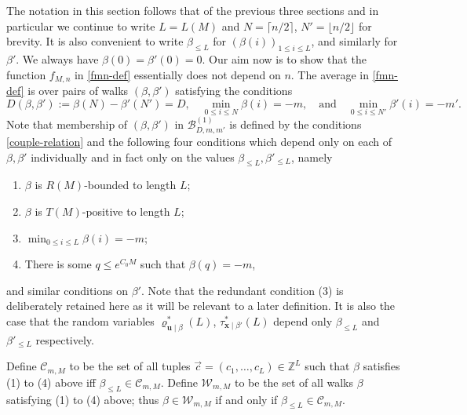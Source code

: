 \documentclass[11pt,reqno]{amsart}
\numberwithin{equation}{section}
\theoremstyle{definition}
\theoremstyle{remark}
\newcommand{\mbf}{\mathbf}
\renewcommand{\le}{\leqslant}
\newcommand\Z{\mathbb{Z}}
\begin{document}
The notation in this section follows that of the previous three sections and in particular we continue to write $L = L(M)$ and $N = \lceil n/2\rceil$, $N' = \lfloor n/2\rfloor$ for brevity. It is also convenient to write $\beta_{\le L}$ for $(\beta(i))_{1 \le i \le L}$, and similarly for $\beta'$. We always have $\beta(0) = \beta'(0) = 0$. Our aim now is to show that the function $f_{M,n}$ in \cref{fmn-def} essentially does not depend on $n$. The average in \cref{fmn-def} is over pairs of walks $(\beta,\beta')$ satisfying the conditions \begin{equation}\label{couple-relation} D(\beta,\beta') := \beta(N) - \beta'(N') = D, \quad \min_{0 \le i \le N} \beta(i) = -m, \quad \mbox{and} \quad \min_{0 \le i \le N'} \beta'(i) = -m'.\end{equation}
Note that membership of $(\beta, \beta')$ in $\mathscr{B}^{(1)}_{D,m,m'}$ is defined by the conditions \cref{couple-relation} and the  following four conditions which depend only on each of $\beta,\beta'$ individually and in fact only on the values $\beta_{\le L}, \beta'_{\le L}$, namely 
\begin{enumerate}
    \item $\beta$ is $R(M)$-bounded to length $L$;
    \item $\beta$ is $T(M)$-positive to length $L$;
    \item $\min_{0 \le i \le L} \beta(i) = -m$;
    \item There is some $q \le e^{C_0 M}$ such that $\beta(q) = -m$,
\end{enumerate}
and similar conditions on $\beta'$. Note that the redundant condition (3) is deliberately retained here as it will be relevant to a later definition. It is also the case that the random variables $ \varrho^*_{\mbf{u} \mid \beta}(L)$, $\tau^*_{\mbf{x} \mid \beta'}(L)$ depend only $\beta_{\le L}$ and $\beta'_{\le L}$ respectively.

Define $\mathscr{C}_{m,M}$ to be the set of all tuples $\vec{c} = (c_1,\dots, c_L) \in \Z^L$ such that $\beta$ satisfies (1) to (4) above iff $\beta_{\le L} \in \mathscr{C}_{m,M}$. Define $\mathscr{W}_{m,M}$ to be the set of all walks $\beta$ satisfying (1) to (4) above; thus $\beta \in \mathscr{W}_{m,M}$ if and only if $\beta_{\le L} \in \mathscr{C}_{m,M}$.
\end{document}
